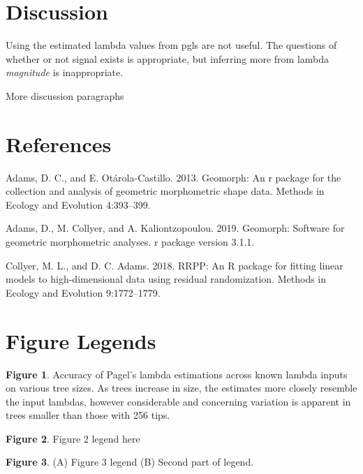 \documentclass[]{article}
\begin{document}
\section{Discussion}\label{discussion}

Using the estimated lambda values from pgls are not useful. The
questions of whether or not signal exists is appropriate, but inferring
more from lambda \emph{magnitude} is inappropriate. \hfill\break

More discussion paragraphs

\newpage

\section{References}\label{references}

\setlength{\parindent}{-0.25in} \setlength{\leftskip}{0.25in}
\setlength{\parskip}{8pt} \noindent

\hypertarget{refs}{}
\hypertarget{ref-AdamsOtarola2013}{}
Adams, D. C., and E. Otárola-Castillo. 2013. Geomorph: An r package for
the collection and analysis of geometric morphometric shape data.
Methods in Ecology and Evolution 4:393--399.

\hypertarget{ref-AdamsGeomorph}{}
Adams, D., M. Collyer, and A. Kaliontzopoulou. 2019. Geomorph: Software
for geometric morphometric analyses. r package version 3.1.1.

\hypertarget{ref-CollyerAdams2018}{}
Collyer, M. L., and D. C. Adams. 2018. RRPP: An R package for fitting
linear models to high-dimensional data using residual randomization.
Methods in Ecology and Evolution 9:1772--1779.

\newpage

\section{Figure Legends}\label{figure-legends}

\textbf{Figure 1}. Accuracy of Pagel's lambda estimations across known
lambda inputs on various tree sizes. As trees increase in size, the
estimates more closely resemble the input lambdas, however considerable
and concerning variation is apparent in trees smaller than those with
256 tips. \hfill\break

\textbf{Figure 2}. Figure 2 legend here\hfill\break

\textbf{Figure 3}. (A) Figure 3 legend (B) Second part of legend.
\hfill\break

\newpage
\end{document}
